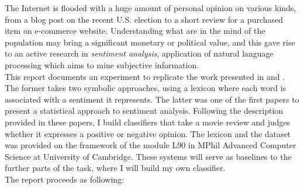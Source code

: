 The Internet is flooded with a huge amount of personal opinion on various kinds, from a blog post on the recent U.S. election to a short review for a purchased item on e-commerce website. Understanding what are in the mind of the population may bring a significant monetary or political value, and this gave rise to an active research in {\em sentiment analysis}, application of natural language processing which aims to mine subjective information. \\
This report documents an experiment to replicate the work presented in \cite{wilson2005recognizing} and \cite{pang2002thumbs}. The former takes two symbolic approaches, using a lexicon where each word is associated with a sentiment it represents. The latter was one of the first papers to present a statistical approach to sentiment analysis. Following the description provided in these papers, I build classifiers that take a movie review and judges whether it expresses a positive or negative opinion. The lexicon and the dataset was provided on the framework of the module L90 in MPhil Advanced Computer Science at University of Cambridge. These systems will serve as baselines to the further parts of the task, where I will build my own classifier.\\
The report proceeds as following: %